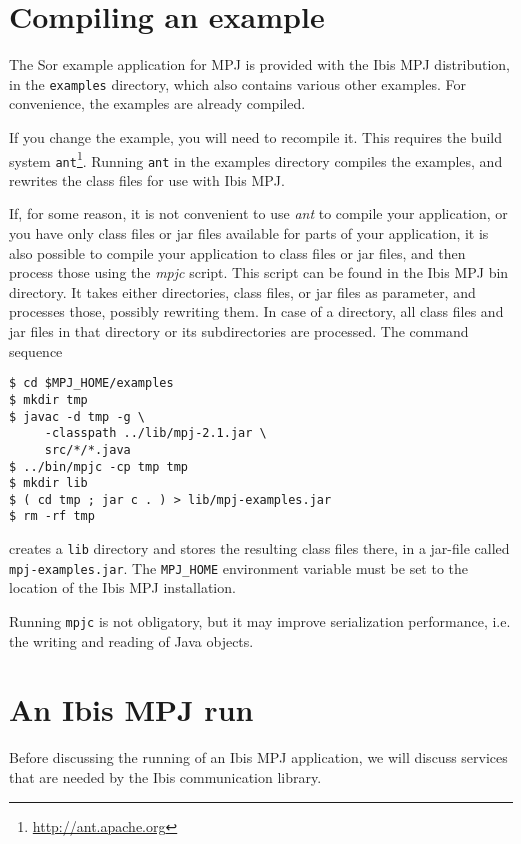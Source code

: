 \documentclass[a4paper,10pt]{article}
\begin{document}
\section{Compiling an example}

The Sor example application for MPJ is
provided with the Ibis MPJ distribution, in the \texttt{examples} directory,
which also contains various other examples.
For convenience, the examples are already compiled.

If you change the example, you will need to recompile it. This
requires the build system \texttt{ant}\footnote{\url{http://ant.apache.org}}.
Running \texttt{ant} in the examples directory compiles the examples,
and rewrites the class files for use with Ibis MPJ.

If, for some reason, it is not convenient to use \emph{ant} to compile
your application, or you have only class files or jar files available
for parts of your application, it is also possible to compile
your application to class files or jar files, and then process those
using the \emph{mpjc} script. This script can be found in the Ibis MPJ
bin directory. It takes either directories, class files, or jar files
as parameter, and processes those, possibly rewriting them. In case
of a directory, all class files and jar files in that directory or
its subdirectories are processed.  The command sequence

\begin{verbatim}
$ cd $MPJ_HOME/examples
$ mkdir tmp
$ javac -d tmp -g \
     -classpath ../lib/mpj-2.1.jar \
     src/*/*.java
$ ../bin/mpjc -cp tmp tmp
$ mkdir lib
$ ( cd tmp ; jar c . ) > lib/mpj-examples.jar
$ rm -rf tmp
\end{verbatim}

creates a \texttt{lib} directory and stores the resulting class files there,
in a jar-file called \texttt{mpj-examples.jar}.
The \texttt{MPJ\_HOME} environment variable must be set to the location of
the Ibis MPJ installation.

Running \texttt{mpjc} is not obligatory, but it may improve 
serialization performance, i.e. the writing and reading of Java objects.

\section{An Ibis MPJ run}

Before discussing
the running of an Ibis MPJ application, we will discuss services that are
needed by the Ibis communication library.
\end{document}
